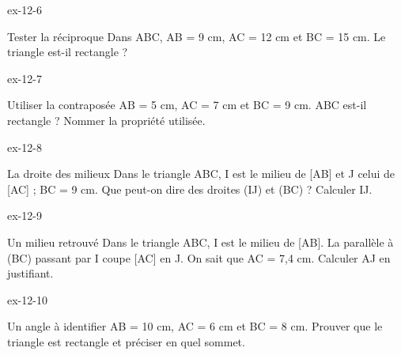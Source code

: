 \clearpage{}
\begin{blocLivre}{ex-12-6}\begin{exercice}[2]{Tester la réciproque}
Dans ABC, AB = 9 cm, AC = 12 cm et BC = 15 cm. Le triangle est-il rectangle ?
\label{fig-ex-12-6}
\end{exercice}\end{blocLivre}
\begin{blocLivre}{ex-12-7}\begin{exercice}[2]{Utiliser la contraposée}
AB = 5 cm, AC = 7 cm et BC = 9 cm. ABC est-il rectangle ? Nommer la propriété utilisée.
\label{fig-ex-12-7}
\end{exercice}\end{blocLivre}
\begin{blocLivre}{ex-12-8}\begin{exercice}[2]{La droite des milieux}
Dans le triangle ABC, I est le milieu de [AB] et J celui de [AC] ; BC = 9 cm. Que peut-on dire des droites (IJ) et (BC) ? Calculer IJ.
\label{fig-ex-12-8}
\end{exercice}\end{blocLivre}
\begin{blocLivre}{ex-12-9}\begin{exercice}[2]{Un milieu retrouvé}
Dans le triangle ABC, I est le milieu de [AB]. La parallèle à (BC) passant par I coupe [AC] en J. On sait que AC = 7,4 cm. Calculer AJ en justifiant.
\label{fig-ex-12-9}
\end{exercice}\end{blocLivre}
\begin{blocLivre}{ex-12-10}\begin{exercice}[2]{Un angle à identifier}
AB = 10 cm, AC = 6 cm et BC = 8 cm. Prouver que le triangle est rectangle et préciser en quel sommet.
\label{fig-ex-12-10}
\end{exercice}\end{blocLivre}

